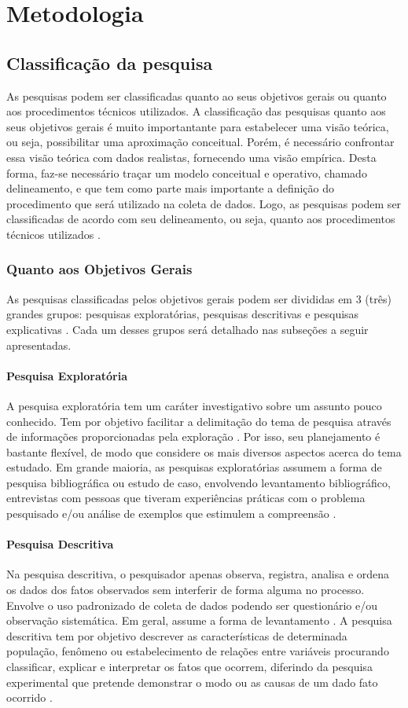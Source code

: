\chapter{Metodologia}
\section{Classificação da pesquisa}
	As pesquisas podem ser classificadas quanto ao seus objetivos gerais ou quanto aos procedimentos técnicos utilizados. A classificação das pesquisas quanto aos seus objetivos gerais é muito importantante para estabelecer uma visão teórica, ou seja, possibilitar uma aproximação conceitual. Porém, é necessário confrontar essa visão teórica com dados realistas, fornecendo uma visão empírica. Desta forma, faz-se necessário traçar um modelo conceitual e operativo, chamado delineamento, e que tem como parte mais importante a definição do procedimento que será utilizado na coleta de dados. Logo, as pesquisas podem ser classificadas de acordo com seu delineamento, ou seja, quanto aos procedimentos técnicos utilizados \cite{ac2002elaborar}.

\subsection{Quanto aos Objetivos Gerais}
	As pesquisas classificadas pelos objetivos gerais podem ser divididas em 3 (três) grandes grupos: pesquisas exploratórias, pesquisas descritivas e pesquisas explicativas \cite{ac2002elaborar}. Cada um desses grupos será detalhado nas subseções a seguir apresentadas. 
\subsubsection{Pesquisa Exploratória}
	A pesquisa exploratória tem um caráter investigativo sobre um assunto pouco conhecido. Tem por objetivo facilitar a delimitação do tema de pesquisa através de informações proporcionadas pela exploração \cite{prodanov2013metodologia}. Por isso, seu planejamento é bastante flexível, de modo que considere os mais diversos aspectos acerca do tema estudado. Em grande maioria, as pesquisas exploratórias assumem a forma de pesquisa bibliográfica ou estudo de caso, envolvendo levantamento bibliográfico, entrevistas com pessoas que tiveram experiências práticas com o problema pesquisado e/ou análise de exemplos que estimulem a compreensão \cite{ac2002elaborar}.
\subsubsection{Pesquisa Descritiva}
	Na pesquisa descritiva, o pesquisador apenas observa, registra, analisa e ordena os dados dos fatos observados sem interferir de forma alguma no processo. Envolve o uso padronizado de coleta de dados podendo ser questionário e/ou observação sistemática. Em geral, assume a forma de levantamento \cite{ac2002elaborar}. 
A pesquisa descritiva tem por objetivo descrever as características de determinada população, fenômeno ou estabelecimento de relações entre variáveis procurando classificar, explicar e interpretar os fatos que ocorrem, diferindo da pesquisa experimental que pretende demonstrar o modo ou as causas de um dado fato ocorrido \cite{prodanov2013metodologia}.
